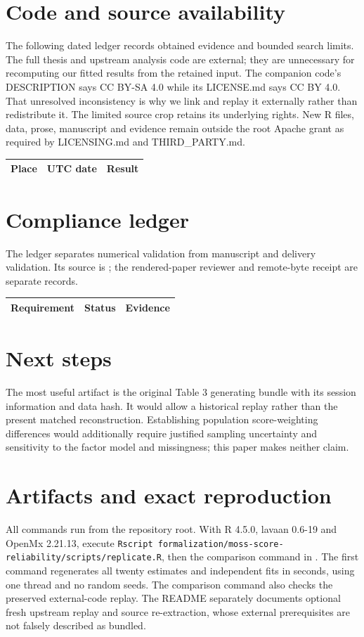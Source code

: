 \section{Code and source availability}
The following dated ledger records obtained evidence and bounded search limits. The full thesis and upstream analysis code are external; they are unnecessary for recomputing our fitted results from the retained input. The companion code's DESCRIPTION says CC BY-SA 4.0 while its LICENSE.md says CC BY 4.0. That unresolved inconsistency is why we link and replay it externally rather than redistribute it. The limited source crop retains its underlying rights. New R files, data, prose, manuscript and evidence remain outside the root Apache grant as required by LICENSING.md and THIRD\_PARTY.md.
\begin{longtable}{p{.21\linewidth}p{.14\linewidth}p{.57\linewidth}}
\toprule Place & UTC date & Result\\\midrule\endhead

\end{longtable}

\section{Compliance ledger}
The ledger separates numerical validation from manuscript and delivery validation. Its source is ; the rendered-paper reviewer and remote-byte receipt are separate records.
\begin{longtable}{p{.24\linewidth}p{.14\linewidth}p{.54\linewidth}}
\toprule Requirement & Status & Evidence\\\midrule\endhead

\end{longtable}

\section{Next steps}
The most useful artifact is the original Table 3 generating bundle with its session information and data hash. It would allow a historical replay rather than the present matched reconstruction. Establishing population score-weighting differences would additionally require justified sampling uncertainty and sensitivity to the factor model and missingness; this paper makes neither claim.

\appendix
\section{Artifacts and exact reproduction}

All commands run from the repository root. With R 4.5.0, lavaan 0.6-19 and OpenMx 2.21.13, execute \texttt{Rscript formalization/moss-score-reliability/scripts/replicate.R}, then the comparison command in . The first command regenerates all twenty estimates and independent fits in seconds, using one thread and no random seeds. The comparison command also checks the preserved external-code replay. The README separately documents optional fresh upstream replay and source re-extraction, whose external prerequisites are not falsely described as bundled.

